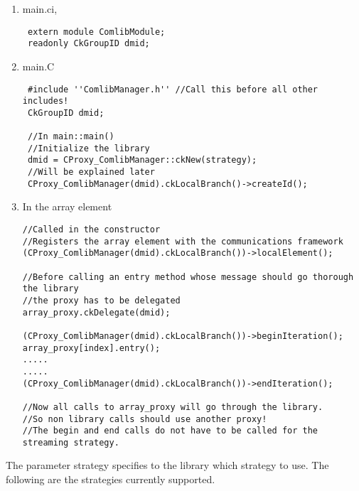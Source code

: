 \begin{enumerate}

\item main.ci, \\
\begin{verbatim}
 extern module ComlibModule; 
 readonly CkGroupID dmid; 
\end{verbatim}

\item main.C \\
\begin{verbatim}
 #include ''ComlibManager.h'' //Call this before all other includes!
 CkGroupID dmid; 

 //In main::main() 
 //Initialize the library
 dmid = CProxy_ComlibManager::ckNew(strategy); 
 //Will be explained later
 CProxy_ComlibManager(dmid).ckLocalBranch()->createId();
\end{verbatim}

\item In the array element \\
\begin{verbatim}
//Called in the constructor
//Registers the array element with the communications framework
(CProxy_ComlibManager(dmid).ckLocalBranch())->localElement();

//Before calling an entry method whose message should go thorough the library 
//the proxy has to be delegated
array_proxy.ckDelegate(dmid);

(CProxy_ComlibManager(dmid).ckLocalBranch())->beginIteration();
array_proxy[index].entry();
.....
.....
(CProxy_ComlibManager(dmid).ckLocalBranch())->endIteration();

//Now all calls to array_proxy will go through the library.
//So non library calls should use another proxy!
//The begin and end calls do not have to be called for the streaming strategy.
\end{verbatim}
\end{enumerate}

The parameter strategy specifies to the library which strategy to
use. The following are the strategies currently supported.

